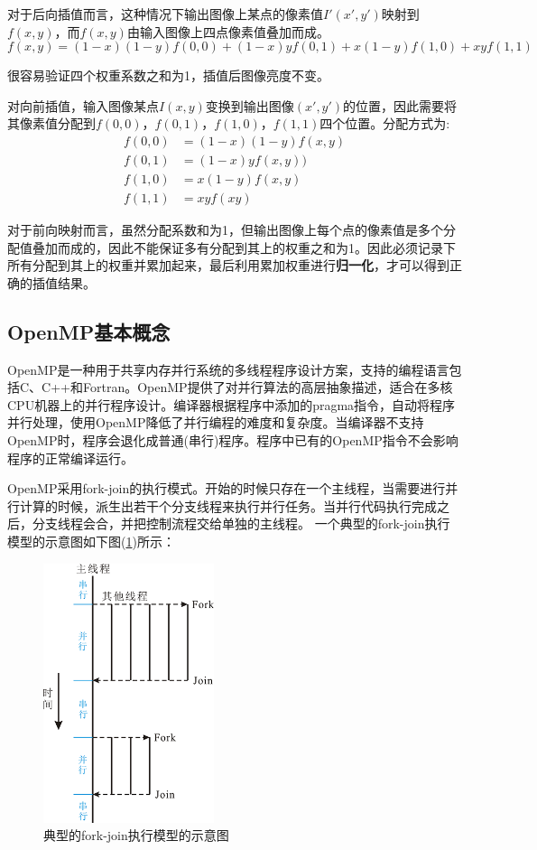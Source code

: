 \documentclass[UTF-8, a4paper, 12pt]{ctexart}
\begin{document}
对于后向插值而言，这种情况下输出图像上某点的像素值$I'(x',y')$映射到$f(x,y)$，而$f(x,y)$由输入图像上四点像素值叠加而成。
\begin{equation}
    f(x,y)=(1-x)(1-y)f(0,0)+(1-x)yf(0,1)+x(1-y)f(1,0)+xyf(1,1)
\end{equation}

很容易验证四个权重系数之和为1，插值后图像亮度不变。

对向前插值，输入图像某点$I(x,y)$变换到输出图像$(x',y')$的位置，因此需要将其像素值分配到$f(0,0)$，$f(0,1)$，$f(1,0)$，$f(1,1)$四个位置。分配方式为:
\begin{align}
    f(0,0)&=(1-x)(1-y)f(x,y)\\
    f(0,1)&=(1-x)yf(x,y))\\
    f(1,0)&=x(1-y)f(x,y)\\
    f(1,1)&=xyf(xy)
\end{align}

对于前向映射而言，虽然分配系数和为1，但输出图像上每个点的像素值是多个分配值叠加而成的，因此不能保证多有分配到其上的权重之和为1。因此必须记录下所有分配到其上的权重并累加起来，最后利用累加权重进行\textbf{归一化}，才可以得到正确的插值结果。


\subsection{OpenMP基本概念}
OpenMP是一种用于共享内存并行系统的多线程程序设计方案，支持的编程语言包括C、C++和Fortran。OpenMP提供了对并行算法的高层抽象描述，适合在多核CPU机器上的并行程序设计。编译器根据程序中添加的pragma指令，自动将程序并行处理，使用OpenMP降低了并行编程的难度和复杂度。当编译器不支持OpenMP时，程序会退化成普通(串行)程序。程序中已有的OpenMP指令不会影响程序的正常编译运行。


OpenMP采用fork-join的执行模式。开始的时候只存在一个主线程，当需要进行并行计算的时候，派生出若干个分支线程来执行并行任务。当并行代码执行完成之后，分支线程会合，并把控制流程交给单独的主线程。
一个典型的fork-join执行模型的示意图如下图(\ref{f4})所示：
\begin{figure}[htbp]
    \centering
    \includegraphics[width=5cm]{fig/f4.png}
    \caption{典型的fork-join执行模型的示意图}
    \label{f4}
\end{figure}
\end{document}
